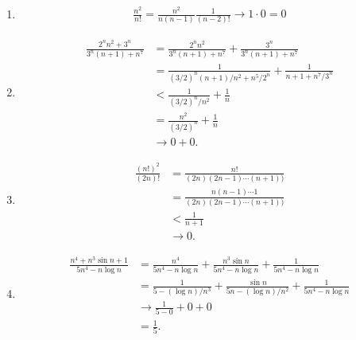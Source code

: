 \documentclass[12pt]{article}
\begin{document}
\begin{enumerate}[label=(\roman*)]
\item
  \begin{align*}
    \frac{n^2}{n!} = \frac{n^2}{n(n-1)}\frac{1}{(n - 2)!} \to 1\cdot 0 = 0
  \end{align*}
\item
  \begin{align*}
         \frac{2^nn^2 + 3^n}{3^n(n + 1) + n^7}
    &=   \frac{2^nn^2}{3^n(n + 1) + n^7} + \frac{3^n}{3^n(n + 1) + n^7}\\
    &=   \frac{1}{(3/2)^n(n + 1)/n^2 + n^5/2^n} + \frac{1}{n + 1 + n^7/3^n}\\
    &<   \frac{1}{(3/2)^n/n^2} + \frac{1}{n}\\
    &=   \frac{n^2}{(3/2)^n} + \frac{1}{n}\\
    &\to 0 + 0.
  \end{align*}
\item
  \begin{align*}
       \frac{(n!)^2}{(2n)!}
    &= \frac{n!}{(2n)(2n - 1)\cdots (n + 1))}\\
    &= \frac{n(n-1)\cdots 1}{(2n)(2n - 1)\cdots (n + 1))}\\
    &< \frac{1}{n + 1}\\
    &\to 0.
  \end{align*}
\item
  \begin{align*}
    \frac{n^4 + n^3\sin n + 1}{5n^4 - n\log n}
    &= \frac{n^4}{5n^4 - n\log n}
    + \frac{n^3\sin n}{5n^4 - n\log n}
    + \frac{1}{5n^4 - n\log n}\\
    &= \frac{1}{5 - (\log n)/n^3}
    + \frac{\sin n}{5n - (\log n)/n^2}
    + \frac{1}{5n^4 - n\log n}\\
    &\to \frac{1}{5 - 0}
    + 0
    + 0\\
    &= \frac{1}{5}.
  \end{align*}
\end{enumerate}


\newpage
\end{document}
